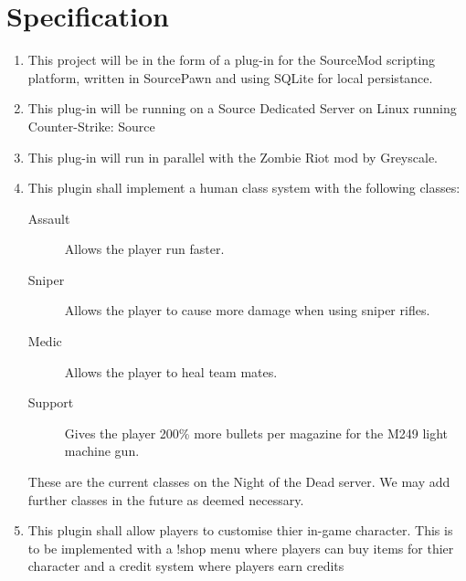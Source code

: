 \documentclass[a4paper, 11pt]{article}
\begin{document}
\section{Specification}
\begin{enumerate}
\item This project will be in the form of a plug-in for the SourceMod\cite{1} scripting platform, written in SourcePawn and using SQLite for local persistance.
\item This plug-in will be running on a Source Dedicated Server on Linux running Counter-Strike: Source
\item This plug-in will run in parallel with the Zombie Riot mod by Greyscale\cite{2}.
\item This plugin shall implement a human class system with the following classes:
\begin{description}
\item[Assault] Allows the player run faster.
\item[Sniper] Allows the player to cause more damage when using sniper rifles.
\item[Medic] Allows the player to heal team mates.
\item[Support] Gives the player 200\% more bullets per magazine for the M249 light machine gun.
\end{description}
These are the current classes on the Night of the Dead server. We may add further classes in the future as deemed necessary.
\item This plugin shall allow players to customise thier in-game character. This is to be implemented with a !shop menu where players can buy items for thier character and a credit system where players earn credits 
\end{enumerate}
\end{document}
